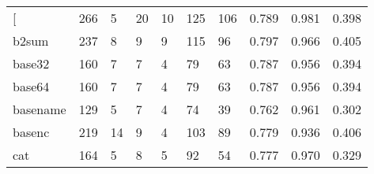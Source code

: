 \begin{longtable}{lp{1.3cm}p{1.3cm}p{1.3cm}p{1.3cm}p{1.3cm}p{1.3cm}p{1.3cm}p{1.3cm}p{1.3cm}}
\bottomrule
\endlastfoot
{[}         &                    266 &                                  5 &                                20 &                               10 &                               125 &                             106 &                                   0.789 &                                  0.981 &                                0.398 \\
b2sum     &                    237 &                                  8 &                                 9 &                                9 &                               115 &                              96 &                                   0.797 &                                  0.966 &                                0.405 \\
base32    &                    160 &                                  7 &                                 7 &                                4 &                                79 &                              63 &                                   0.787 &                                  0.956 &                                0.394 \\
base64    &                    160 &                                  7 &                                 7 &                                4 &                                79 &                              63 &                                   0.787 &                                  0.956 &                                0.394 \\
basename  &                    129 &                                  5 &                                 7 &                                4 &                                74 &                              39 &                                   0.762 &                                  0.961 &                                0.302 \\
basenc    &                    219 &                                 14 &                                 9 &                                4 &                               103 &                              89 &                                   0.779 &                                  0.936 &                                0.406 \\
cat       &                    164 &                                  5 &                                 8 &                                5 &                                92 &                              54 &                                   0.777 &                                  0.970 &                                0.329 \\

\end{longtable}
